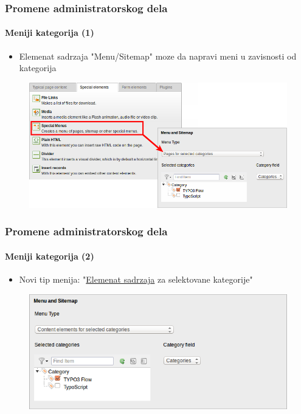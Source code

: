 
\begin{frame}[fragile]
	\frametitle{Promene administratorskog dela}
	\framesubtitle{Meniji kategorija (1)}

	\begin{itemize}
		\item Elemenat sadrzaja "Menu/Sitemap" moze da napravi meni u zavisnosti od kategorija
	\end{itemize}

	\begin{figure}
		\includegraphics[width=0.8\linewidth]{Images/BackendChanges/CategoryBasedMenus.png}
	\end{figure}

\end{frame}


\begin{frame}[fragile]
	\frametitle{Promene administratorskog dela}
	\framesubtitle{Meniji kategorija (2)}

	\begin{itemize}
		\item Novi tip menija: "\underline{Elemenat sadrzaja} za selektovane kategorije"
	\end{itemize}

	\begin{figure}
		\includegraphics[width=0.6\linewidth]{Images/BackendChanges/ContentElementsForSelectedCategories.png}
	\end{figure}

\end{frame}

